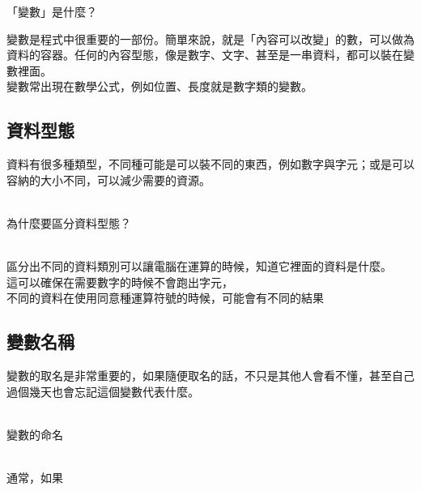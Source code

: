 \documentclass{article}
\begin{document}
\begin{large}


    \begin{LARGE}
        「變數」是什麼？\\
        \end{LARGE}
    
        變數是程式中很重要的一部份。簡單來說，就是「內容可以改變」的數，可以做為資料的容器。任何的內容型態，像是數字、文字、甚至是一串資料，都可以裝在變數裡面。\\
    
        變數常出現在數學公式，例如位置、長度就是數字類的變數。\\
    
    
    
        \subsection{資料型態}
    
        資料有很多種類型，不同種可能是可以裝不同的東西，例如數字與字元；或是可以容納的大小不同，可以減少需要的資源。\\
        \\
        \begin{LARGE}
        為什麼要區分資料型態？\\
        \end{LARGE}
        \\
    
        區分出不同的資料類別可以讓電腦在運算的時候，知道它裡面的資料是什麼。\\
        這可以確保在需要數字的時候不會跑出字元，\\
        不同的資料在使用同意種運算符號的時候，可能會有不同的結果\\
    
    
    
        \subsection{變數名稱}
        變數的取名是非常重要的，如果隨便取名的話，不只是其他人會看不懂，甚至自己過個幾天也會忘記這個變數代表什麼。\\
        \\
        \begin{LARGE}
        變數的命名\\
        \end{LARGE}
        \\
        通常，如果
    

\end{large}
\end{document}
